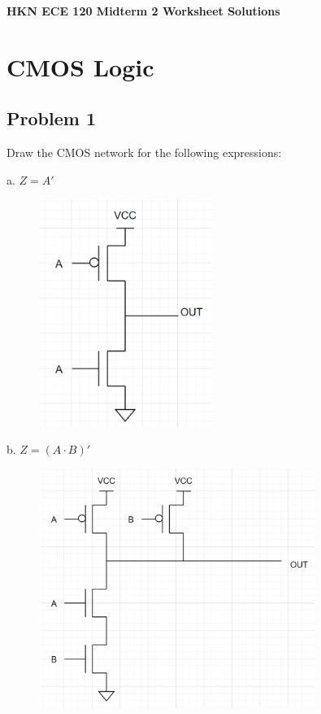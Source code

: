\documentclass{article}
\begin{document}
\begin{center}
\textbf{
{\Large HKN ECE 120 Midterm 2 Worksheet Solutions}
}
\end{center} 
\noindent\makebox[\linewidth]{\rule{\linewidth}{0.2pt}}


\section*{CMOS Logic}
\subsection*{Problem 1}
Draw the CMOS network for the following expressions:


a. $ Z = A' $
\begin{figure}[!h]
    \centering
    \includegraphics[width=0.5\textwidth]{figures/cmos1a_solution.png}
\end{figure}
\newpage

b. $ Z = (A \cdot B)'$
\begin{figure}[!h]
    \centering
    \includegraphics[width=0.8\textwidth]{figures/cmos1b_solution.png}
\end{figure}
\end{document}
